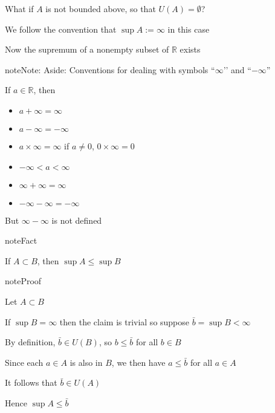 \documentclass[letterpaper,10pt,english]{jupyterBook}
\begin{document}
\sphinxAtStartPar
What if \(A\) is not bounded above, so that \(U(A) = \emptyset\)?

\sphinxAtStartPar
We follow the convention that \(\sup A := \infty\) in this case

\sphinxAtStartPar
Now the supremum of a nonempty subset of \(\mathbb{R}\)  exists

\begin{sphinxadmonition}{note}{Note:}
\sphinxAtStartPar
Aside: Conventions for dealing with symbols “\(\infty\)’’ and ``\(-\infty\)”

\sphinxAtStartPar
If \(a \in \mathbb{R}\), then
\begin{itemize}
\item {} 
\sphinxAtStartPar
\(a + \infty = \infty\)

\item {} 
\sphinxAtStartPar
\(a - \infty = -\infty\)

\item {} 
\sphinxAtStartPar
\(a \times \infty = \infty\) if \(a \ne 0\), \(0 \times \infty = 0\)

\item {} 
\sphinxAtStartPar
\(-\infty < a < \infty\)

\item {} 
\sphinxAtStartPar
\(\infty + \infty = \infty\)

\item {} 
\sphinxAtStartPar
\(-\infty - \infty = -\infty\)

\end{itemize}

\sphinxAtStartPar
But \(\infty - \infty\) is not defined
\end{sphinxadmonition}

\begin{sphinxadmonition}{note}{Fact}

\sphinxAtStartPar
If \(A \subset B\), then \(\sup A \leq \sup B\)
\end{sphinxadmonition}

\begin{figure}[htbp]
\centering

\noindent{}
\end{figure}

\begin{sphinxadmonition}{note}{Proof}

\sphinxAtStartPar
Let \(A \subset B\)

\sphinxAtStartPar
If \(\sup B = \infty\) then the claim is trivial so suppose \(\bar b = \sup B < \infty\)

\sphinxAtStartPar
By definition, \(\bar b \in U(B)\), so \(b \leq \bar b\) for all \(b \in B\)

\sphinxAtStartPar
Since each \(a \in A\) is also in \(B\), we then have \(a \leq \bar b\) for all \(a \in A \)

\sphinxAtStartPar
It follows that \(\bar b \in U(A)\)

\sphinxAtStartPar
Hence \(\sup A \leq \bar b\)
\end{sphinxadmonition}
\end{document}

